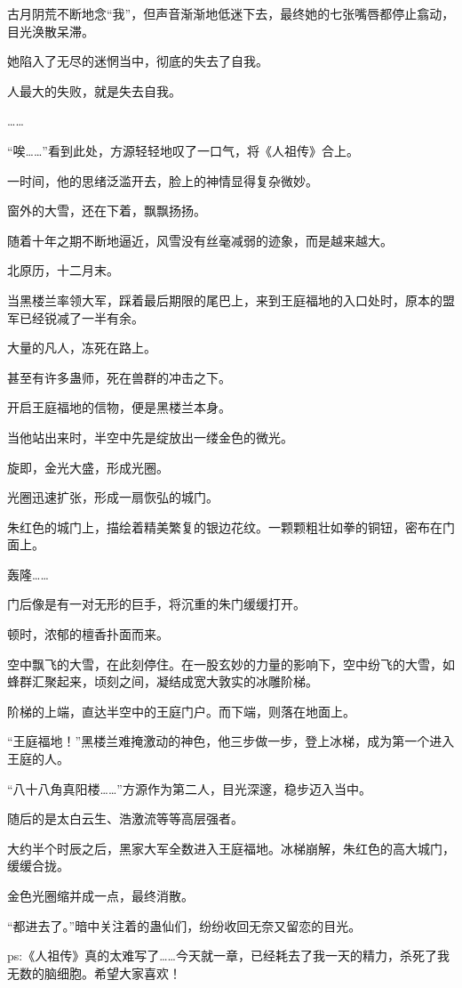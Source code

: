 \begin{this_body}
古月阴荒不断地念“我”，但声音渐渐地低迷下去，最终她的七张嘴唇都停止翕动，目光涣散呆滞。

她陷入了无尽的迷惘当中，彻底的失去了自我。

人最大的失败，就是失去自我。

……

“唉……”看到此处，方源轻轻地叹了一口气，将《人祖传》合上。

一时间，他的思绪泛滥开去，脸上的神情显得复杂微妙。

窗外的大雪，还在下着，飘飘扬扬。

随着十年之期不断地逼近，风雪没有丝毫减弱的迹象，而是越来越大。

北原历，十二月末。

当黑楼兰率领大军，踩着最后期限的尾巴上，来到王庭福地的入口处时，原本的盟军已经锐减了一半有余。

大量的凡人，冻死在路上。

甚至有许多蛊师，死在兽群的冲击之下。

开启王庭福地的信物，便是黑楼兰本身。

当他站出来时，半空中先是绽放出一缕金色的微光。

旋即，金光大盛，形成光圈。

光圈迅速扩张，形成一扇恢弘的城门。

朱红色的城门上，描绘着精美繁复的银边花纹。一颗颗粗壮如拳的铜钮，密布在门面上。

轰隆……

门后像是有一对无形的巨手，将沉重的朱门缓缓打开。

顿时，浓郁的檀香扑面而来。

空中飘飞的大雪，在此刻停住。在一股玄妙的力量的影响下，空中纷飞的大雪，如蜂群汇聚起来，顷刻之间，凝结成宽大敦实的冰雕阶梯。

阶梯的上端，直达半空中的王庭门户。而下端，则落在地面上。

“王庭福地！”黑楼兰难掩激动的神色，他三步做一步，登上冰梯，成为第一个进入王庭的人。

“八十八角真阳楼……”方源作为第二人，目光深邃，稳步迈入当中。

随后的是太白云生、浩激流等等高层强者。

大约半个时辰之后，黑家大军全数进入王庭福地。冰梯崩解，朱红色的高大城门，缓缓合拢。

金色光圈缩并成一点，最终消散。

“都进去了。”暗中关注着的蛊仙们，纷纷收回无奈又留恋的目光。

ps:《人祖传》真的太难写了……今天就一章，已经耗去了我一天的精力，杀死了我无数的脑细胞。希望大家喜欢！

\end{this_body}

